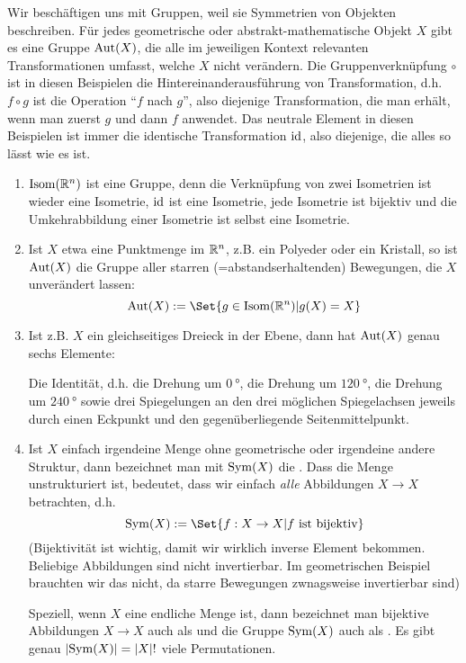 \begin{example}[Symmetriegruppen]
Wir beschäftigen uns mit Gruppen, weil sie Symmetrien von Objekten beschreiben. Für jedes geometrische oder abstrakt-mathematische Objekt $X$ gibt es eine Gruppe $\operatorname{Aut}(X)$, die alle im jeweiligen Kontext relevanten Transformationen umfasst, welche $X$ nicht verändern. Die Gruppenverknüpfung $\circ$ ist in diesen Beispielen die Hintereinanderausführung von Transformation, d.h. $f\circ g$ ist die Operation \enquote{$f$ nach $g$}, also diejenige Transformation, die man erhält, wenn man zuerst $g$ und dann $f$ anwendet. Das neutrale Element in diesen Beispielen ist immer die identische Transformation $\operatorname{id}$, also diejenige, die alles so lässt wie es ist.

\begin{enumerate}
\item $\operatorname{Isom}(\mathbb{R}^n)$ ist eine Gruppe, denn die Verknüpfung von zwei Isometrien ist wieder eine Isometrie, $\operatorname{id}$ ist eine Isometrie, jede Isometrie ist bijektiv und die Umkehrabbildung einer Isometrie ist selbst eine Isometrie.
\item Ist $X$ etwa eine Punktmenge im $\mathbb{R}^n$, z.B. ein Polyeder oder ein Kristall, so ist $\operatorname{Aut}(X)$ die Gruppe aller starren (=abstandserhaltenden) Bewegungen, die $X$ unverändert lassen:
\[\Aut(X) := \Set{g\in\Isom(\IR^n) | g(X) = X}\]
\item Ist z.B. $X$ ein gleichseitiges Dreieck in der Ebene, dann hat $\operatorname{Aut}(X)$ genau sechs Elemente:

Die Identität, d.h. die Drehung um $\SI{0}{\degree}$, die Drehung um $\SI{120}{\degree}$, die Drehung um $\SI{240}{\degree}$ sowie drei Spiegelungen an den drei möglichen Spiegelachsen jeweils durch einen Eckpunkt und den gegenüberliegende Seitenmittelpunkt.

\item Ist $X$ einfach irgendeine Menge ohne geometrische oder irgendeine andere Struktur, dann bezeichnet man mit $\operatorname{Sym}(X)$ die . Dass die Menge unstrukturiert ist, bedeutet, dass wir einfach \emph{alle} Abbildungen $X\to X$ betrachten, d.h.
\[\Sym(X) := \Set{f: X\to X | f\text{ ist bijektiv}}\]
(Bijektivität ist wichtig, damit wir wirklich inverse Element bekommen. Beliebige Abbildungen sind nicht invertierbar. Im geometrischen Beispiel brauchten wir das nicht, da starre Bewegungen zwnagsweise invertierbar sind)

Speziell, wenn $X$ eine endliche Menge ist, dann bezeichnet man bijektive Abbildungen $X\to X$ auch als  und die Gruppe $\operatorname{Sym}(X)$ auch als . Es gibt genau $\lvert\operatorname{Sym}(X)\rvert = \lvert X\rvert!$ viele Permutationen.


\end{enumerate}
\end{example}
